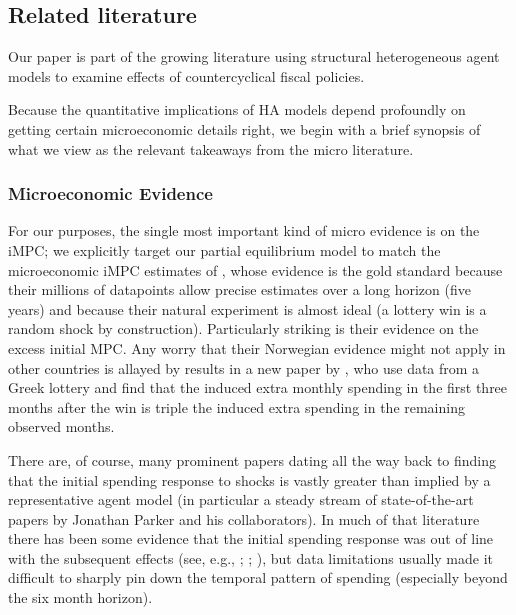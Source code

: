 \documentclass[\econtexRoot/HAFiscal]{subfiles}
\begin{document}
\hypertarget{related-literature}{}\par\subsection{Related literature}
\notinsubfile{\label{sec:lit}}


Our paper is part of the growing literature using structural heterogeneous agent models to examine effects of countercyclical fiscal policies.

Because the quantitative implications of HA models depend profoundly on getting certain microeconomic details right, we begin with a brief synopsis of what we view as the relevant takeaways from the micro literature.%

\hypertarget{microeconomic-evidence}{}
\subsubsection{Microeconomic Evidence}
For our purposes, the single most important kind of micro evidence is on the iMPC; we explicitly target our partial equilibrium model to match the microeconomic iMPC estimates of \cite{fagereng_mpc_2021}, whose evidence is the gold standard because their millions of datapoints allow precise estimates over a long horizon (five years) and because their natural experiment is almost ideal (a lottery win is a random shock by construction).  Particularly striking is their evidence on the excess initial MPC.  Any worry that their Norwegian evidence might not apply in other countries is allayed by results in a new paper by \cite{kotsogiannisMPCs}, who use data from a Greek lottery and find that the induced extra monthly spending in the first three months after the win is triple the induced extra spending in the remaining observed months.

There are, of course, many prominent papers dating all the way back to \cite{friedman:windfalls} finding that the initial spending response to shocks is vastly greater than implied by a representative agent model (in particular a steady stream of state-of-the-art papers by Jonathan Parker and his collaborators). In much of that literature there has been some evidence that the initial spending response was out of line with the subsequent effects (see, e.g., \cite{parker2013consumer}; \cite{broda2014economic}; \cite{jpsTax}), but data limitations usually made it difficult to sharply pin down the temporal pattern of spending (especially beyond the six month horizon).
\end{document}
